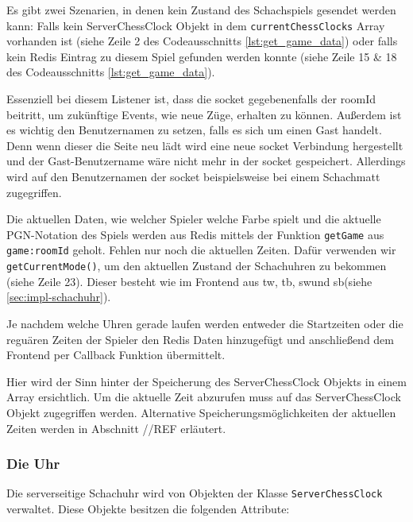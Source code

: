 Es gibt zwei Szenarien, in denen kein Zustand des Schachspiels gesendet werden kann: Falls kein ServerChessClock Objekt in dem \verb|currentChessClocks| Array vorhanden ist (siehe Zeile 2 des Codeausschnitts \ref{lst:get_game_data}) oder falls kein Redis Eintrag zu diesem Spiel gefunden werden konnte (siehe Zeile 15 \& 18 des Codeausschnitts \ref{lst:get_game_data}).

Essenziell bei diesem Listener ist, dass die socket gegebenenfalls der roomId beitritt, um zukünftige Events, wie neue Züge, erhalten zu können. Außerdem ist es wichtig den Benutzernamen zu setzen, falls es sich um einen Gast handelt. Denn wenn dieser die Seite neu lädt wird eine neue socket Verbindung hergestellt und der Gast-Benutzername wäre nicht mehr in der socket gespeichert. Allerdings wird auf den Benutzernamen der socket beispielsweise bei einem Schachmatt zugegriffen.

Die aktuellen Daten, wie welcher Spieler welche Farbe spielt und die aktuelle PGN-Notation des Spiels werden aus Redis mittels der Funktion \verb|getGame| aus \verb|game:roomId| geholt. Fehlen nur noch die aktuellen Zeiten. Dafür verwenden wir \verb|getCurrentMode()|, um den aktuellen Zustand der Schachuhren zu bekommen (siehe Zeile 23). Dieser besteht wie im Frontend aus \glqq tw\grqq , \glqq tb\grqq , \glqq sw\grqq{ }und \glqq sb\grqq{ }(siehe \ref{sec:impl-schachuhr}). 

Je nachdem welche Uhren gerade laufen werden entweder die Startzeiten oder die reguären Zeiten der Spieler den Redis Daten hinzugefügt und anschließend dem Frontend per Callback Funktion übermittelt.

Hier wird der Sinn hinter der Speicherung des ServerChessClock Objekts in einem Array ersichtlich. Um die aktuelle Zeit abzurufen muss auf das ServerChessClock Objekt zugegriffen werden. Alternative Speicherungsmöglichkeiten der aktuellen Zeiten werden in Abschnitt //REF erläutert.

\subsubsection{Die Uhr}
\label{sec:Uhr-Backend-impl}
Die serverseitige Schachuhr wird von Objekten der Klasse \verb|ServerChessClock| verwaltet. Diese Objekte besitzen die folgenden Attribute:

